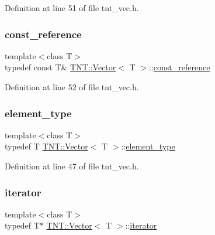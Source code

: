 Definition at line 51 of file tnt\+\_\+vec.\+h.

\mbox{\label{classTNT_1_1Vector_a2957faed9560f1f53bc5943a160d71bf}} 
\subsubsection{\texorpdfstring{const\+\_\+reference}{const\_reference}}
{\footnotesize\ttfamily template$<$class T$>$ \\
typedef const T\& \hyperlink{classTNT_1_1Vector}{T\+N\+T\+::\+Vector}$<$ T $>$\+::\hyperlink{classTNT_1_1Vector_a2957faed9560f1f53bc5943a160d71bf}{const\+\_\+reference}}



Definition at line 52 of file tnt\+\_\+vec.\+h.

\mbox{\label{classTNT_1_1Vector_af87934ec2406d242f6cc98035686bd1f}} 
\subsubsection{\texorpdfstring{element\+\_\+type}{element\_type}}
{\footnotesize\ttfamily template$<$class T$>$ \\
typedef T \hyperlink{classTNT_1_1Vector}{T\+N\+T\+::\+Vector}$<$ T $>$\+::\hyperlink{classTNT_1_1Vector_af87934ec2406d242f6cc98035686bd1f}{element\+\_\+type}}



Definition at line 47 of file tnt\+\_\+vec.\+h.

\mbox{\label{classTNT_1_1Vector_a7289b2334c4c28181bb4193fa32fc48a}} 
\subsubsection{\texorpdfstring{iterator}{iterator}}
{\footnotesize\ttfamily template$<$class T$>$ \\
typedef T$\ast$ \hyperlink{classTNT_1_1Vector}{T\+N\+T\+::\+Vector}$<$ T $>$\+::\hyperlink{classTNT_1_1Vector_a7289b2334c4c28181bb4193fa32fc48a}{iterator}}



